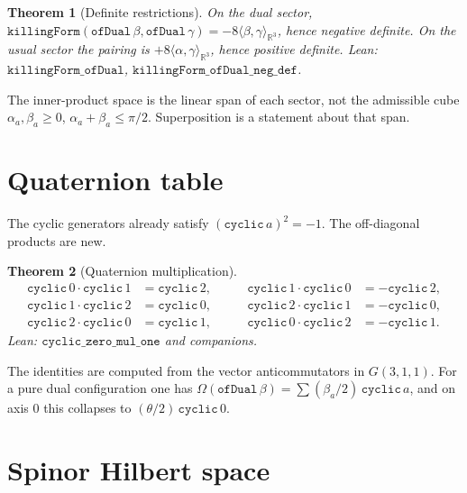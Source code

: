 \documentclass[dvipdfmx,11pt,a4paper]{article}
\newtheorem{theorem}{Theorem}[section]
\theoremstyle{definition}
\theoremstyle{remark}
\begin{document}
\begin{theorem}[Definite restrictions]
\label{thm:sector}
On the dual sector,
$\texttt{killingForm}(\texttt{ofDual}\,\beta,\texttt{ofDual}\,\gamma)
=-8\langle\beta,\gamma\rangle_{\mathbb{R}^3}$,
hence negative definite. On the usual sector the pairing is
$+8\langle\alpha,\gamma\rangle_{\mathbb{R}^3}$, hence positive
definite. Lean: $\texttt{killingForm\_ofDual}$,
$\texttt{killingForm\_ofDual\_neg\_def}$.
\end{theorem}

The inner-product space is the linear span of each sector, not the
admissible cube $\alpha_a,\beta_a\ge 0$, $\alpha_a+\beta_a\le\pi/2$.
Superposition is a statement about that span.

\section{Quaternion table}
\label{sec:quat}

The cyclic generators already satisfy
$(\texttt{cyclic}\,a)^2=-1$. The off-diagonal products are new.

\begin{theorem}[Quaternion multiplication]
\label{thm:quat}
\[
\begin{aligned}
\texttt{cyclic}\,0\cdot\texttt{cyclic}\,1&=\texttt{cyclic}\,2,\\
\texttt{cyclic}\,1\cdot\texttt{cyclic}\,2&=\texttt{cyclic}\,0,\\
\texttt{cyclic}\,2\cdot\texttt{cyclic}\,0&=\texttt{cyclic}\,1,
\end{aligned}
\qquad
\begin{aligned}
\texttt{cyclic}\,1\cdot\texttt{cyclic}\,0&=-\texttt{cyclic}\,2,\\
\texttt{cyclic}\,2\cdot\texttt{cyclic}\,1&=-\texttt{cyclic}\,0,\\
\texttt{cyclic}\,0\cdot\texttt{cyclic}\,2&=-\texttt{cyclic}\,1.
\end{aligned}
\]
Lean: $\texttt{cyclic\_zero\_mul\_one}$ and companions.
\end{theorem}

The identities are computed from the vector anticommutators in
$G(3,1,1)$. For a pure dual configuration one has
$\Omega(\texttt{ofDual}\,\beta)=\sum(\beta_a/2)\,\texttt{cyclic}\,a$,
and on axis $0$ this collapses to $(\theta/2)\,\texttt{cyclic}\,0$.

\section{Spinor Hilbert space}
\label{sec:spinor}
\end{document}
